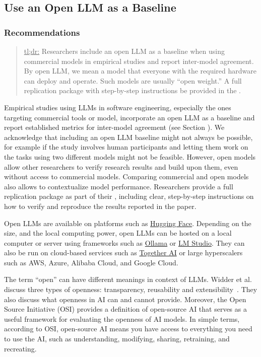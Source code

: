 



\subsection{Use an Open LLM as a Baseline}

\subsubsection{Recommendations}

\begin{quote}
\underline{tl;dr:} Researchers \should include an open LLM as a baseline when using commercial models in empirical studies and report inter-model agreement. By open LLM, we mean a model that everyone with the required hardware can deploy and operate. Such models are usually ``open weight.'' A full replication package with step-by-step instructions \should be provided in the \supplementarymaterial.
\end{quote}

Empirical studies using LLMs in software engineering, especially the ones targeting commercial tools or model, \should incorporate an open LLM as a baseline and report established metrics for inter-model agreement (see Section \benchmarksmetrics).
We acknowledge that including an open LLM baseline might not always be possible, for example if the study involves human participants and letting them work on the tasks using two different models might not be feasible.
However, open models allow other researchers to verify research results and build upon them, even without access to commercial models.
Comparing commercial and open models also allows to contextualize model performance.
Researchers \should provide a full replication package as part of their \supplementarymaterial, including clear, step-by-step instructions on how to verify and reproduce the results reported in the paper.

Open LLMs are available on platforms such as \href{https://huggingface.co/}{Hugging Face}.
Depending on the size, and the local computing power, open LLMs can be hosted on a local computer or server using frameworks such as \href{https://ollama.com/}{Ollama} or \href{https://lmstudio.ai/}{LM Studio}.
They can also be run on cloud-based services such as \href{https://together.ai/}{Together AI} or large hyperscalers such as AWS, Azure, Alibaba Cloud, and Google Cloud.

The term ``open'' can have different meanings in context of LLMs.
Widder et al. discuss three types of openness: transparency, reusability and extensibility~\cite{widder2024open}.
They also discuss what openness in AI can and cannot provide.
Moreover, the Open Source Initiative (OSI) \cite{OSIAI2024} provides a definition of open-source AI that serves as a useful framework for evaluating the openness of AI models.
In simple terms, according to OSI, open-source AI means  you have access to everything you need to use the AI, such as understanding, modifying, sharing, retraining, and recreating.


